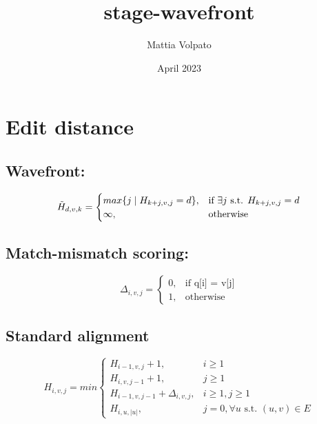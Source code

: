 \documentclass{article}
\title{stage-wavefront}
\author{Mattia Volpato}
\date{April 2023}
\begin{document}
\maketitle

\section{Edit distance}

\subsection{Wavefront:}
\begin{equation}
    \Tilde{H}_{d,v,k} = \begin{cases}
        max\{j \mid H_{k+j,v,j} = d\}, & \text{if } \exists j \text{ s.t. } H_{k+j,v,j} = d \\
        \infty, & \text{otherwise}
    \end{cases}
\end{equation}


\subsection{Match-mismatch scoring:}
\begin{equation}
    \Delta_{i,v,j} = \begin{cases}
        0, & \text{if $$q[i] = v[j]$$} \\
        1, & \text{otherwise}
    \end{cases}
\end{equation}

\subsection{Standard alignment}
\begin{equation}
    H_{i,v,j} = min \begin{cases}
        H_{i-1,v,j} + 1, & i \ge 1 \\
        H_{i,v,j-1} + 1, & j \ge 1 \\
        H_{i-1,v,j-1} + \Delta_{i,v,j}, & i\ge1, j\ge1 \\
        H_{i,u,\lvert{u}\rvert}, & j=0, \forall u \text{ s.t. } (u, v) \in E
    \end{cases}
\end{equation}
\end{document}
